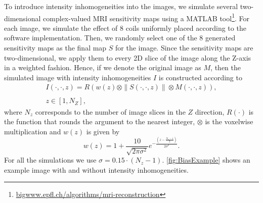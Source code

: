 To introduce intensity inhomogeneities into the images, we simulate several two-
dimensional complex-valued MRI sensitivity maps using a MATLAB
tool\footnote{\url{bigwww.epfl.ch/algorithms/mri-reconstruction}}. For each
image, we simulate the effect of 8 coils uniformly placed according to the
software implementation. Then, we randomly select one of the 8 generated
sensitivity maps as the final map $S$ for the image. Since the sensitivity maps
are two-dimensional, we apply them to every 2D slice of the image along the
Z-axis in a weighted fashion. Hence, if we denote the original image as $M$,
then the simulated image with intensity inhomogeneities $I$ is constructed
according to
\begin{equation*}
    \begin{array}{c}
        I(\cdot,\cdot,z) = R\left(w(z) \otimes \|S(\cdot,\cdot,z)\| \otimes M(\cdot,\cdot,z)\right), \\ \\ z \in [1, N_{Z}],
    \end{array}
\end{equation*}
where $N_{z}$ corresponds to the number of image slices in the $Z$ direction,
$R(\cdot)$ is the function that rounds the argument to the nearest integer,
$\otimes$ is the voxelwise multiplication and $w(z)$ is given by
\begin{equation*}
    w(z) = 1 + \frac{10}{\sqrt{2\pi\sigma^{2}}}e^{-\frac{\left(z - \frac{N_{z}-1}{2}\right)}{2\sigma^{2}}}.
\end{equation*}
For all the simulations we use $\sigma = 0.15 \cdot (N_{z} - 1)$.
\cref{fig:BiasExample} shows an example image with and without intensity
inhomogeneities.
